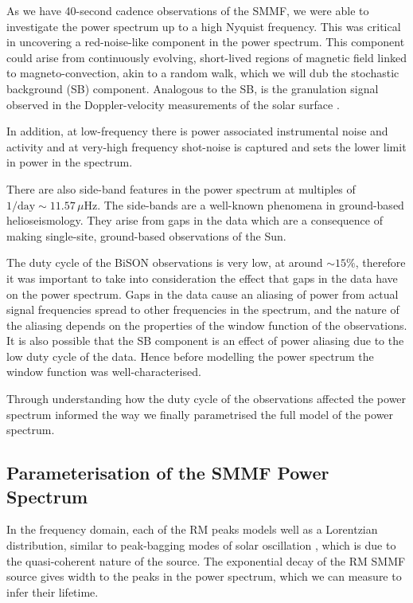 As we have 40-second cadence observations of the SMMF, we were able to investigate the power spectrum up to a high Nyquist frequency. This was critical in uncovering a red-noise-like component in the power spectrum. This component could arise from continuously evolving, short-lived regions of magnetic field linked to magneto-convection, akin to a random walk, which we will dub the stochastic background (SB) component. Analogous to the SB, is the granulation signal observed in the Doppler-velocity measurements of the solar surface \citep{basu_asteroseismic_2017}. 

In addition, at low-frequency there is power associated instrumental noise and activity and at very-high frequency shot-noise is captured and sets the lower limit in power in the spectrum. 

There are also side-band features in the power spectrum at multiples of $1/\mathrm{day} \sim 11.57 \, \mu\mathrm{Hz}$. The side-bands are a well-known phenomena in ground-based helioseismology. They arise from gaps in the data which are a consequence of making single-site, ground-based observations of the Sun.

The duty cycle of the BiSON observations is very low, at around $\sim 15\%$, therefore it was important to take into consideration the effect that gaps in the data have on the power spectrum. Gaps in the data cause an aliasing of power from actual signal frequencies spread to other frequencies in the spectrum, and the nature of the aliasing depends on the properties of the window function of the observations. It is also possible that the SB component is an effect of power aliasing due to the low duty cycle of the data. Hence before modelling the power spectrum the window function was well-characterised.

Through understanding how the duty cycle of the observations affected the power spectrum informed the way we finally parametrised the full model of the power spectrum.


\subsection{Parameterisation of the SMMF Power Spectrum}

In the frequency domain, each of the RM peaks models well as a Lorentzian distribution, similar to peak-bagging modes of solar oscillation \citep{handberg_bayesian_2011, davies_low-frequency_2014}, which is due to the quasi-coherent nature of the source. The exponential decay of the RM SMMF source gives width to the peaks in the power spectrum, which we can measure to infer their lifetime.

